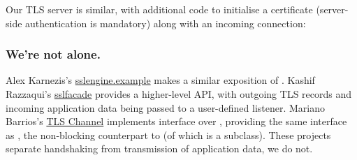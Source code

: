 \noindent
Our TLS server is similar, with additional code to initialise a certificate (server-side authentication is mandatory) 
along with an incoming connection:





\lstset{widthgobble=1*1}


\subsubsection*{We're not alone.}

Alex Karnezis's \href{https://github.com/alkarn/sslengine.example}{sslengine.example} makes a 
similar exposition of . 
%
Kashif Razzaqui's \href{https://github.com/kashifrazzaqui/sslfacade/}{sslfacade} provides a 
higher-level API, with outgoing TLS records and incoming application data being passed to 
a user-defined listener.
%
Mariano Barrios's \href{https://github.com/marianobarrios/tls-channel}{TLS Channel} implements
interface  over , providing the same interface as 
, the non-blocking counterpart to  (of which 
is a subclass).
%
These projects separate handshaking from transmission of application data, we do not.
